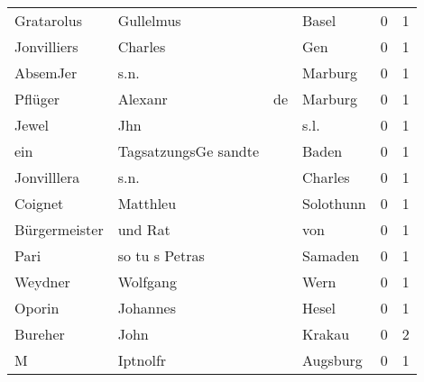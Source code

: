 \begin{center}
\begin{tiny}
\begin{longtabu}{llllrr}
               Gratarolus &                          Gullelmus &             &                                       Basel &          0 &         1 \\
              Jonvilliers &                            Charles &             &                                         Gen &          0 &         1 \\
                 AbsemJer &                               s.n. &             &                                     Marburg &          0 &         1 \\
                  Pflüger &                            Alexanr &          de &                                     Marburg &          0 &         1 \\
                    Jewel &                                Jhn &             &                                        s.l. &          0 &         1 \\
                      ein &               TagsatzungsGe sandte &             &                                       Baden &          0 &         1 \\
              Jonvilllera &                               s.n. &             &                                     Charles &          0 &         1 \\
                  Coignet &                           Matthleu &             &                                   Solothunn &          0 &         1 \\
            Bürgermeister &                            und Rat &             &                                         von &          0 &         1 \\
                     Pari &                     so tu s Petras &             &                                     Samaden &          0 &         1 \\
                  Weydner &                           Wolfgang &             &                                        Wern &          0 &         1 \\
                   Oporin &                           Johannes &             &                                       Hesel &          0 &         1 \\
                  Bureher &                               John &             &                                      Krakau &          0 &         2 \\
                        M &                           Iptnolfr &             &                                    Augsburg &          0 &         1 \\

\end{longtabu}
\end{tiny}
\end{center}
